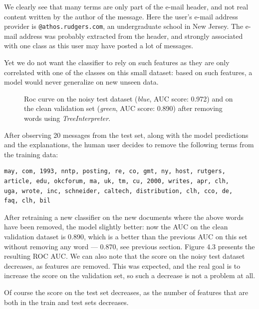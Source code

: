 \documentclass[a4paper,11pt]{kth-mag}
\begin{document}
We clearly see that many terms are only part of the e-mail header, and not real content written by the author of the message. Here the user's e-mail address provider is \texttt{@athos.rudgers.com}, an undergraduate school in New Jersey. The e-mail address was probably extracted from the header, and strongly associated with one class as this user may have posted a lot of messages.

Yet we do not want the classifier to rely on such features as they are only correlated with one of the classes on this small dataset: based on such features, a model would never generalize on new unseen data.

\begin{figure}[h!]
		\centering
    	\def\svgwidth{\columnwidth}
    	\resizebox{0.6\textwidth}{!}{}
    	\caption{Roc curve on the noisy test dataset (\textit{blue}, AUC score: 0.972) and on the clean validation set (\textit{green}, AUC score: 0.890) after removing words using \textit{TreeInterpreter}.}
\end{figure}

After observing 20 messages from the test set, along with the model predictions and the explanations, the human user decides to remove the following terms from the training data:

\begin{center}
\begin{verbatim}
may, com, 1993, nntp, posting, re, co, gmt, ny, host, rutgers, 
article, edu, okcforum, ma, uk, tm, cu, 2000, writes, apr, clh, 
uga, wrote, inc, schneider, caltech, distribution, clh, cco, de, 
faq, clh, bil
\end{verbatim}
\end{center}

After retraining a new classifier on the new documents where the above words have been removed, the model slightly better: now the AUC on the clean validation dataset is 0.890, which is a better than the previous AUC on this set without removing any word --- 0.870, see previous section. Figure 4.3 presents the resulting ROC AUC. We can also note that the score on the noisy test dataset decreases, as features are removed. This was expected, and the real goal is to increase the score on the validation set, so such a decrease is not a problem at all.

Of course the score on the test set decreases, as the number of features that are both in the train and test sets decreases.
\end{document}
